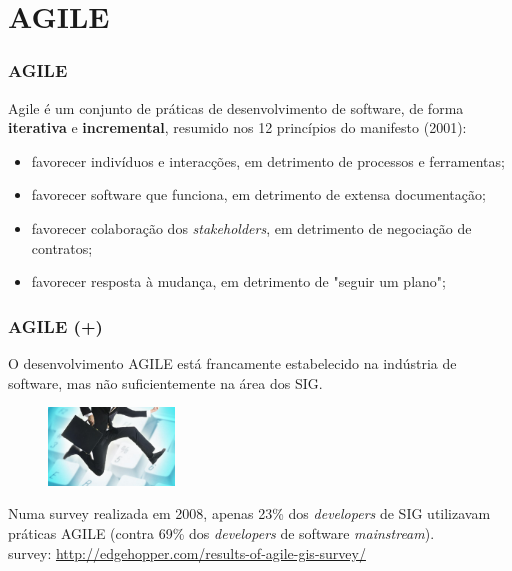 \documentclass[hyperref={pdfpagelabels=true}]{beamer}
\begin{document}
\section{AGILE}
\begin{frame}
\frametitle{AGILE}
Agile \'{e} um conjunto de pr\'{a}ticas de desenvolvimento de software, de forma \textbf{iterativa} e \textbf{incremental}, 
resumido nos 12 princ\'{i}pios do manifesto (2001):


\begin{itemize}
  \item<2-> favorecer indiv\'{i}duos e interac\c{c}\~{o}es, em detrimento de processos e ferramentas;
  \item<3-> favorecer software que funciona, em detrimento de extensa documenta\c{c}\~{a}o;%
  \item<4-> favorecer colabora\c{c}\~{a}o dos \textit{stakeholders}, em detrimento de negocia\c{c}\~{a}o de contratos;%
  \item<5-> favorecer resposta \`{a} mudan\c{c}a, em detrimento de "seguir um plano";%
\end{itemize}


\end{frame}

\begin{frame}
\frametitle{AGILE (+)}
O desenvolvimento AGILE est\'{a} francamente estabelecido na ind\'{u}stria de software, mas n\~{a}o suficientemente na \'{a}rea dos SIG. %


    \begin{figure}
      \includegraphics[width=0.3\textwidth]{agile1.jpg}
    \end{figure}

\small{
Numa survey realizada em 2008, apenas 23\% dos \textit{developers} de SIG utilizavam pr\'{a}ticas AGILE (contra 69\% dos \textit{developers} de software \textit{mainstream}).\\
\tiny{
survey: \url{http://edgehopper.com/results-of-agile-gis-survey/}
}
}
\end{frame}
\end{document}
